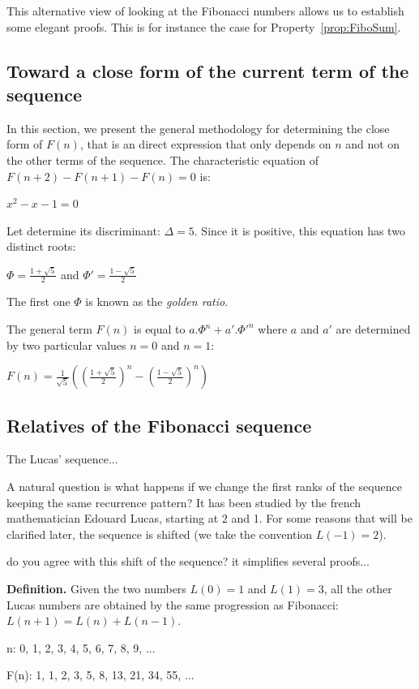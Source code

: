 This alternative view of looking at the Fibonacci numbers allows us to establish some elegant proofs.
This is for instance the case for Property~\ref{prop:FiboSum}. 

\subsection{Toward a close form of the current term of the sequence}

In this section, we present the general methodology for determining the close form of $F(n)$,
that is an direct expression that only depends on $n$ and not on the other terms of the sequence.
The characteristic equation of $F(n+2) - F(n+1) - F(n) =0$ is:

$x^2 - x - 1 = 0$

Let determine its discriminant: $\Delta = 5$.
Since it is positive, this equation has two distinct roots:

$\Phi = \frac{1+\sqrt{5}}{2}$ and $\Phi' = \frac{1-\sqrt{5}}{2}$

The first one $\Phi$ is known as the \textit{golden ratio}. 

The general term $F(n)$ is equal to $a.\Phi^n + a'.\Phi'^n$ where $a$ and $a'$ are determined by two particular values $n=0$ and $n=1$:

$F(n)= \frac{1}{\sqrt{5}} ((\frac{1+\sqrt{5}}{2})^n - (\frac{1-\sqrt{5}}{2})^n)$

\subsection{Relatives of the Fibonacci sequence}

The Lucas' sequence...

A natural question is what happens if we change the first ranks of the sequence keeping the same recurrence pattern?
It has been studied by the french mathematician Edouard Lucas, starting at 2 and 1. 
For some reasons that will be clarified later, the sequence is shifted (we take the convention $L(-1)=2$).

{\Denis do you agree with this shift of the sequence? it simplifies several proofs...}
\bigskip

\noindent
{\bf Definition.}
Given the two numbers $L(0) = 1$ and $L(1) = 3$, 
all the other Lucas numbers are obtained by the same progression as Fibonacci: 
$L(n+1) = L(n)+L(n-1)$.
\bigskip

n: 0, 1, 2, 3, 4, 5, 6, 7, 8, 9, ...

F(n): 1, 1, 2, 3, 5, 8, 13, 21, 34, 55, ...

